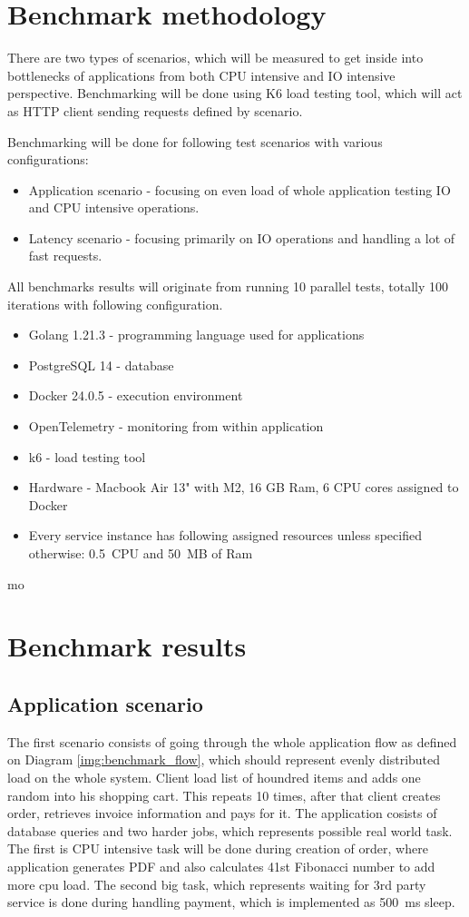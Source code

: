 
\section{Benchmark methodology}
There are two types of scenarios, which will be measured to get inside into bottlenecks of applications from both CPU intensive and IO intensive perspective. Benchmarking will be done using K6 load testing tool, which will act as HTTP client sending requests defined by scenario.

Benchmarking will be done for following test scenarios with various configurations:
\begin{itemize}
    \item Application scenario - focusing on even load of whole application testing IO and CPU intensive operations.
    \item Latency scenario - focusing primarily on IO operations and handling a lot of fast requests.
\end{itemize}

All benchmarks results will originate from running 10 parallel tests, totally 100 iterations with following configuration.
\begin{itemize}
    \item Golang 1.21.3 - programming language used for applications
    \item PostgreSQL 14 - database
    \item Docker 24.0.5 - execution environment
    \item OpenTelemetry - monitoring from within application
    \item k6 - load testing tool
    \item Hardware - Macbook Air 13" with M2, 16 GB Ram, 6 CPU cores assigned to Docker
    \item Every service instance has following assigned resources unless specified otherwise: 0.5~CPU and 50~MB of Ram
\end{itemize}mo


\section{Benchmark results}

\subsection{Application scenario}
The first scenario consists of going through the whole application flow as defined on Diagram \ref{img:benchmark_flow}, which should represent evenly distributed load on the whole system. Client load list of houndred items and adds one random into his shopping cart. This repeats 10 times, after that client creates order, retrieves invoice information and pays for it. The application cosists of database queries and two harder jobs, which represents possible real world task. The first is CPU intensive task will be done during creation of order, where application generates PDF and also calculates 41st Fibonacci number to add more cpu load. The second big task, which represents waiting for 3rd party service is done during handling payment, which is implemented as 500~ms sleep.

